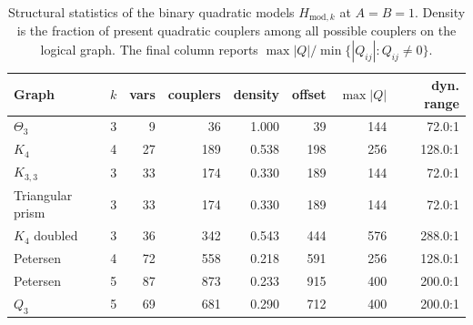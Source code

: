 \begin{table}[t]
\centering
\small
\caption{Structural statistics of the binary quadratic models $H_{\mathrm{mod},k}$ at $A=B=1$. Density is the fraction of present quadratic couplers among all possible couplers on the logical graph. The final column reports $\max|Q|/\min\{|Q_{ij}|:Q_{ij}\neq 0\}$.}
\label{tab:qubo-structure}
\begin{tabular}{lrrrrrrr}
\hline
Graph & $k$ & vars & couplers & density & offset & $\max |Q|$ & dyn. range \\
\hline
$\Theta_3$ & 3 & 9 & 36 & 1.000 & 39 & 144 & 72.0:1 \\
$K_4$ & 4 & 27 & 189 & 0.538 & 198 & 256 & 128.0:1 \\
$K_{3,3}$ & 3 & 33 & 174 & 0.330 & 189 & 144 & 72.0:1 \\
Triangular prism & 3 & 33 & 174 & 0.330 & 189 & 144 & 72.0:1 \\
$K_4$ doubled & 3 & 36 & 342 & 0.543 & 444 & 576 & 288.0:1 \\
Petersen & 4 & 72 & 558 & 0.218 & 591 & 256 & 128.0:1 \\
Petersen & 5 & 87 & 873 & 0.233 & 915 & 400 & 200.0:1 \\
$Q_3$ & 5 & 69 & 681 & 0.290 & 712 & 400 & 200.0:1 \\
\hline
\end{tabular}
\end{table}
